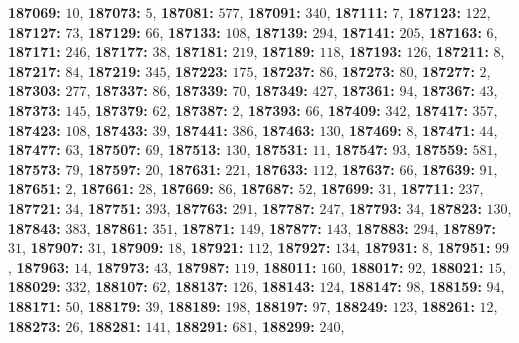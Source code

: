\textsf{\bfseries 187069:} $10$, \textsf{\bfseries 187073:} $5$, \textsf{\bfseries 187081:} $577$, \textsf{\bfseries 187091:} $340$, \textsf{\bfseries 187111:} $7$, \textsf{\bfseries 187123:} $122$, \textsf{\bfseries 187127:} $73$, \textsf{\bfseries 187129:} $66$, \textsf{\bfseries 187133:} $108$, \textsf{\bfseries 187139:} $294$, \textsf{\bfseries 187141:} $205$, \textsf{\bfseries 187163:} $6$, \textsf{\bfseries 187171:} $246$, \textsf{\bfseries 187177:} $38$, \textsf{\bfseries 187181:} $219$, \textsf{\bfseries 187189:} $118$, \textsf{\bfseries 187193:} $126$, \textsf{\bfseries 187211:} $8$, \textsf{\bfseries 187217:} $84$, \textsf{\bfseries 187219:} $345$, \textsf{\bfseries 187223:} $175$, \textsf{\bfseries 187237:} $86$, \textsf{\bfseries 187273:} $80$, \textsf{\bfseries 187277:} $2$, \textsf{\bfseries 187303:} $277$, \textsf{\bfseries 187337:} $86$, \textsf{\bfseries 187339:} $70$, \textsf{\bfseries 187349:} $427$, \textsf{\bfseries 187361:} $94$, \textsf{\bfseries 187367:} $43$, \textsf{\bfseries 187373:} $145$, \textsf{\bfseries 187379:} $62$, \textsf{\bfseries 187387:} $2$, \textsf{\bfseries 187393:} $66$, \textsf{\bfseries 187409:} $342$, \textsf{\bfseries 187417:} $357$, \textsf{\bfseries 187423:} $108$, \textsf{\bfseries 187433:} $39$, \textsf{\bfseries 187441:} $386$, \textsf{\bfseries 187463:} $130$, \textsf{\bfseries 187469:} $8$, \textsf{\bfseries 187471:} $44$, \textsf{\bfseries 187477:} $63$, \textsf{\bfseries 187507:} $69$, \textsf{\bfseries 187513:} $130$, \textsf{\bfseries 187531:} $11$, \textsf{\bfseries 187547:} $93$, \textsf{\bfseries 187559:} $581$, \textsf{\bfseries 187573:} $79$, \textsf{\bfseries 187597:} $20$, \textsf{\bfseries 187631:} $221$, \textsf{\bfseries 187633:} $112$, \textsf{\bfseries 187637:} $66$, \textsf{\bfseries 187639:} $91$, \textsf{\bfseries 187651:} $2$, \textsf{\bfseries 187661:} $28$, \textsf{\bfseries 187669:} $86$, \textsf{\bfseries 187687:} $52$, \textsf{\bfseries 187699:} $31$, \textsf{\bfseries 187711:} $237$, \textsf{\bfseries 187721:} $34$, \textsf{\bfseries 187751:} $393$, \textsf{\bfseries 187763:} $291$, \textsf{\bfseries 187787:} $247$, \textsf{\bfseries 187793:} $34$, \textsf{\bfseries 187823:} $130$, \textsf{\bfseries 187843:} $383$, \textsf{\bfseries 187861:} $351$, \textsf{\bfseries 187871:} $149$, \textsf{\bfseries 187877:} $143$, \textsf{\bfseries 187883:} $294$, \textsf{\bfseries 187897:} $31$, \textsf{\bfseries 187907:} $31$, \textsf{\bfseries 187909:} $18$, \textsf{\bfseries 187921:} $112$, \textsf{\bfseries 187927:} $134$, \textsf{\bfseries 187931:} $8$, \textsf{\bfseries 187951:} $99$, \textsf{\bfseries 187963:} $14$, \textsf{\bfseries 187973:} $43$, \textsf{\bfseries 187987:} $119$, \textsf{\bfseries 188011:} $160$, \textsf{\bfseries 188017:} $92$, \textsf{\bfseries 188021:} $15$, \textsf{\bfseries 188029:} $332$, \textsf{\bfseries 188107:} $62$, \textsf{\bfseries 188137:} $126$, \textsf{\bfseries 188143:} $124$, \textsf{\bfseries 188147:} $98$, \textsf{\bfseries 188159:} $94$, \textsf{\bfseries 188171:} $50$, \textsf{\bfseries 188179:} $39$, \textsf{\bfseries 188189:} $198$, \textsf{\bfseries 188197:} $97$, \textsf{\bfseries 188249:} $123$, \textsf{\bfseries 188261:} $12$, \textsf{\bfseries 188273:} $26$, \textsf{\bfseries 188281:} $141$, \textsf{\bfseries 188291:} $681$, \textsf{\bfseries 188299:} $240$, 
